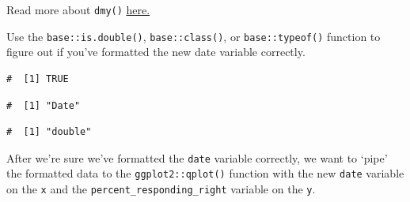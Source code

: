 \documentclass[letterpaper,12pt,twoside,]{pinp}
\begin{document}
Read more about \texttt{dmy()}
\href{https://lubridate.tidyverse.org/reference/ymd.html}{here.}

Use the \texttt{base::is.double()}, \texttt{base::class()}, or
\texttt{base::typeof()} function to figure out if you've formatted the
new date variable correctly.

\begin{Shaded}
\begin{Highlighting}[]
\SpecialCharTok{::}\SpecialCharTok{$}
\end{Highlighting}
\end{Shaded}

\begin{ShadedResult}
\begin{verbatim}
#  [1] TRUE
\end{verbatim}
\end{ShadedResult}

\begin{Shaded}
\begin{Highlighting}[]
\SpecialCharTok{::}\SpecialCharTok{$}
\end{Highlighting}
\end{Shaded}

\begin{ShadedResult}
\begin{verbatim}
#  [1] "Date"
\end{verbatim}
\end{ShadedResult}

\begin{Shaded}
\begin{Highlighting}[]
\SpecialCharTok{::}\SpecialCharTok{$}
\end{Highlighting}
\end{Shaded}

\begin{ShadedResult}
\begin{verbatim}
#  [1] "double"
\end{verbatim}
\end{ShadedResult}

After we're sure we've formatted the \texttt{date} variable correctly,
we want to `pipe' the formatted data to the \texttt{ggplot2::qplot()}
function with the new \texttt{date} variable on the \texttt{x} and the
\texttt{percent\_responding\_right} variable on the \texttt{y}.
\end{document}
